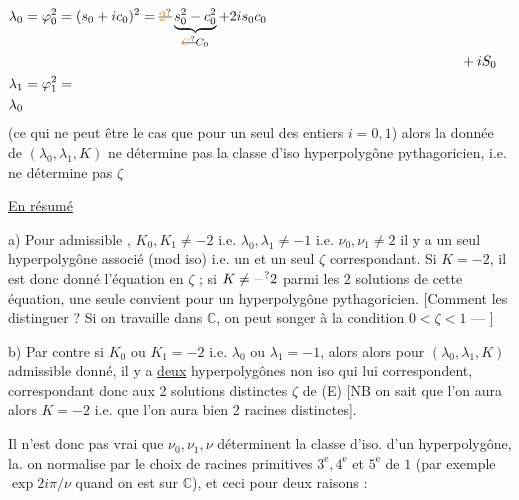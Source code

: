 \[
\begin{aligned}
\lambda_0&=\varphi_0^2=(s_0+ic_0)^2=\deleted{\unsure{2}}\underbrace{s_0^2-c_0^2}_{\deleted{\unsure{C}}C_0}+2is_0c_0\\
&&&\hspace{4.5cm}{}+iS_0\\
\lambda_1&=\varphi_1^2=\\
\lambda_0&
\end{aligned}
\]
 (ce qui ne \unsure{;} peut être le cas que pour un seul des entiers $i=0,1$) alors la donnée de $(\lambda_0,\lambda_1,K)$ ne détermine pas la classe d'iso  hyperpolygône pythagoricien, i.e. ne détermine pas $\zeta$

\uline{En résumé}

a) Pour  admissible ,  $K_0,K_1\ne-2$ i.e. $\lambda_0,\lambda_1\ne-1$ i.e. $\nu_0,\nu_1\ne2$ il y a un  seul hyperpolygône associé (mod iso) i.e. un et un seul $\zeta$ correspondant. Si $K=-2$,  il est donc donné   l'équation en $\zeta$ ; si $K\ne\unsure{-}2$ parmi les 2 solutions de cette équation, une seule convient pour  un hyperpolygône pythagoricien. [Comment les distinguer ? Si on travaille dans $\mathbb C$, on peut songer à la condition $0<\zeta<1$ --- ]

b) Par contre si $K_0$ ou $K_1=-2$ i.e. $\lambda_0$ ou $\lambda_1=-1$,  alors alors pour $(\lambda_0,\lambda_1,K)$ admissible  donné, il y a \uline{deux} hyperpolygônes non iso qui lui correspondent, correspondant donc aux 2 solutions distinctes $\zeta$ de (E) [NB on sait  que l'on aura alors $K=-2$ i.e. que l'on aura bien 2 racines distinctes].

Il n'est donc pas vrai que $\nu_0,\nu_1,\nu$ déterminent la classe d'iso. d'un hyperpolygône,  la.
on normalise  par le choix de racines primitives $3^{\mathrm e},4^{\mathrm e}$ et $5^{\mathrm e}$ de $1$ (par exemple $\exp 2i\pi/\nu$ quand on est sur $\mathbb C$), et ceci pour deux raisons :

